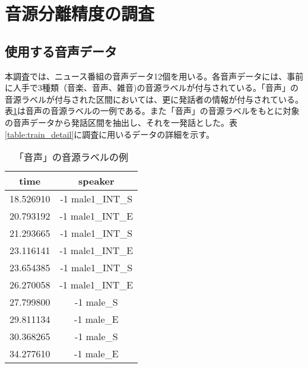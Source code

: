 \section{音源分離精度の調査}
\subsection{使用する音声データ}
\label{section:detail_train_news}
本調査では、ニュース番組の音声データ12個を用いる。各音声データには、事前に人手で3種類（音楽、音声、雑音)の音源ラベルが付与されている。「音声」の音源ラベルが付与された区間においては、更に発話者の情報が付与されている。表\ref{fig:example_label}は音声の音源ラベルの一例である。また「音声」の音源ラベルをもとに対象の音声データから発話区間を抽出し、それを一発話とした。表\ref{table:train_detail}に調査に用いるデータの詳細を示す。\vspace{0.2in}

\begin{table}[H]
\begin{center}
\caption{「音声」の音源ラベルの例 \label{fig:example_label}}
\begin{tabular}{|c|c|}
\hline
time      & speaker          \\ \hline
18.526910 & -1 male1\_INT\_S \\ \hline
20.793192 & -1 male1\_INT\_E \\ \hline
21.293665 & -1 male1\_INT\_S \\ \hline
23.116141 & -1 male1\_INT\_E \\ \hline
23.654385 & -1 male1\_INT\_S \\ \hline
26.270058 & -1 male1\_INT\_E \\ \hline
27.799800 & -1 male\_S       \\ \hline
29.811134 & -1 male\_E       \\ \hline
30.368265 & -1 male\_S       \\ \hline
34.277610 & -1 male\_E       \\ \hline
\end{tabular}
\end{center}
\end{table}

